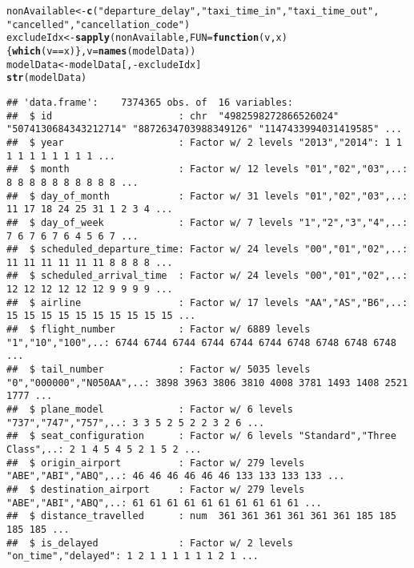 \documentclass{article}\usepackage[]{graphicx}\usepackage[]{color}
\makeatletter
\newcommand{\hlstr}[1]{\textcolor[rgb]{0.192,0.494,0.8}{#1}}%
\newcommand{\hlopt}[1]{\textcolor[rgb]{0,0,0}{#1}}%
\newcommand{\hlstd}[1]{\textcolor[rgb]{0.345,0.345,0.345}{#1}}%
\newcommand{\hlkwa}[1]{\textcolor[rgb]{0.161,0.373,0.58}{\textbf{#1}}}%
\newcommand{\hlkwb}[1]{\textcolor[rgb]{0.69,0.353,0.396}{#1}}%
\newcommand{\hlkwc}[1]{\textcolor[rgb]{0.333,0.667,0.333}{#1}}%
\newcommand{\hlkwd}[1]{\textcolor[rgb]{0.737,0.353,0.396}{\textbf{#1}}}%
\newenvironment{kframe}{%
 \def\at@end@of@kframe{}%
 \ifinner\ifhmode%
  \def\at@end@of@kframe{\end{minipage}}%
  \begin{minipage}{\columnwidth}%
 \fi\fi%
 \def\FrameCommand##1{\hskip\@totalleftmargin \hskip-\fboxsep
 \colorbox{shadecolor}{##1}\hskip-\fboxsep
     \hskip-\linewidth \hskip-\@totalleftmargin \hskip\columnwidth}%
 \MakeFramed {\advance\hsize-\width
   \@totalleftmargin\z@ \linewidth\hsize
   \@setminipage}}%
 {\par\unskip\endMakeFramed%
 \at@end@of@kframe}
\newenvironment{knitrout}{}{} %
\makeatother
\begin{document}
\begin{knitrout}
\color{fgcolor}\begin{kframe}
\begin{alltt}
\hlstd{nonAvailable} \hlkwb{<-} \hlkwd{c}\hlstd{(}\hlstr{"departure_delay"}\hlstd{,} \hlstr{"taxi_time_in"}\hlstd{,} \hlstr{"taxi_time_out"}\hlstd{,}
                  \hlstr{"cancelled"}\hlstd{,} \hlstr{"cancellation_code"}\hlstd{)}
\hlstd{excludeIdx} \hlkwb{<-} \hlkwd{sapply}\hlstd{(nonAvailable,} \hlkwc{FUN}\hlstd{=}\hlkwa{function}\hlstd{(}\hlkwc{v}\hlstd{,} \hlkwc{x}\hlstd{)\{} \hlkwd{which}\hlstd{(v}\hlopt{==}\hlstd{x) \},} \hlkwc{v}\hlstd{=}\hlkwd{names}\hlstd{(modelData))}
\hlstd{modelData} \hlkwb{<-} \hlstd{modelData[,}\hlopt{-}\hlstd{excludeIdx]}
\hlkwd{str}\hlstd{(modelData)}
\end{alltt}
\begin{verbatim}
## 'data.frame':	7374365 obs. of  16 variables:
##  $ id                      : chr  "4982598272866526024" "5074130684343212714" "8872634703988349126" "1147433994031419585" ...
##  $ year                    : Factor w/ 2 levels "2013","2014": 1 1 1 1 1 1 1 1 1 1 ...
##  $ month                   : Factor w/ 12 levels "01","02","03",..: 8 8 8 8 8 8 8 8 8 8 ...
##  $ day_of_month            : Factor w/ 31 levels "01","02","03",..: 11 17 18 24 25 31 1 2 3 4 ...
##  $ day_of_week             : Factor w/ 7 levels "1","2","3","4",..: 7 6 7 6 7 6 4 5 6 7 ...
##  $ scheduled_departure_time: Factor w/ 24 levels "00","01","02",..: 11 11 11 11 11 11 8 8 8 8 ...
##  $ scheduled_arrival_time  : Factor w/ 24 levels "00","01","02",..: 12 12 12 12 12 12 9 9 9 9 ...
##  $ airline                 : Factor w/ 17 levels "AA","AS","B6",..: 15 15 15 15 15 15 15 15 15 15 ...
##  $ flight_number           : Factor w/ 6889 levels "1","10","100",..: 6744 6744 6744 6744 6744 6744 6748 6748 6748 6748 ...
##  $ tail_number             : Factor w/ 5035 levels "0","000000","N050AA",..: 3898 3963 3806 3810 4008 3781 1493 1408 2521 1777 ...
##  $ plane_model             : Factor w/ 6 levels "737","747","757",..: 3 3 5 2 5 2 2 3 2 6 ...
##  $ seat_configuration      : Factor w/ 6 levels "Standard","Three Class",..: 2 1 4 5 4 5 2 1 5 2 ...
##  $ origin_airport          : Factor w/ 279 levels "ABE","ABI","ABQ",..: 46 46 46 46 46 46 133 133 133 133 ...
##  $ destination_airport     : Factor w/ 279 levels "ABE","ABI","ABQ",..: 61 61 61 61 61 61 61 61 61 61 ...
##  $ distance_travelled      : num  361 361 361 361 361 361 185 185 185 185 ...
##  $ is_delayed              : Factor w/ 2 levels "on_time","delayed": 1 2 1 1 1 1 1 1 2 1 ...
\end{verbatim}
\end{kframe}
\end{knitrout}
\end{document}
